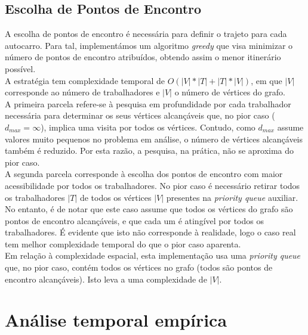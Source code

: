 \documentclass{report}
\begin{document}
  \section{Escolha de Pontos de Encontro}
    A escolha de pontos de encontro é necessária para definir o trajeto para
    cada autocarro. Para tal, implementámos um algoritmo \textit{greedy} que visa
    minimizar o número de pontos de encontro atribuídos, obtendo assim o menor
    itinerário possível.\\
    A estratégia tem complexidade temporal de $O(|V| * |T| + |T| * |V|)$, em que
    $|V|$ corresponde ao número de trabalhadores e $|V|$ o número de vértices do
    grafo. \\
    A primeira parcela refere-se à pesquisa em profundidade por cada trabalhador
    necessária para determinar os seus vértices alcançáveis que, no pior caso
    ($d_{max} = \infty$), implica uma visita por todos os vértices. Contudo, como
    $d_{max}$ assume valores muito pequenos no problema em análise, o número de
    vértices alcançáveis também é reduzido. Por esta razão, a pesquisa, na prática,
    não se aproxima do pior caso.\\
    A segunda parcela corresponde à escolha dos pontos de encontro com maior 
    acessibilidade por todos os trabalhadores. No pior caso é necessário retirar
    todos os trabalhadores $|T|$ de todos os vértices $|V|$ presentes na \textit{priority queue}
    auxiliar. No entanto, é de notar que este caso assume que todos os vértices
    do grafo são pontos de encontro alcançáveis, e que cada um é atingível por
    todos os trabalhadores. É evidente que isto não corresponde à realidade,
    logo o caso real tem melhor complexidade temporal do que o pior caso aparenta.\\
    Em relação à complexidade espacial, esta implementação usa uma \textit{priority queue}
    que, no pior caso, contém todos os vértices no grafo (todos são pontos de encontro alcançáveis).
    Isto leva a uma complexidade de $|V|$.

\chapter{Análise temporal empírica}
\end{document}
